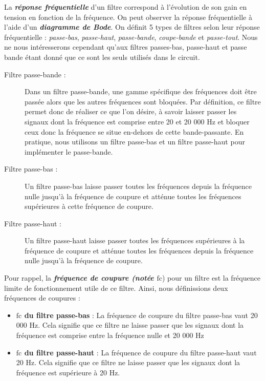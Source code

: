 \documentclass[10pt, oneside, a4paper]{article}
\begin{document}
La \textbf{\textit{réponse fréquentielle}} d'un filtre correspond à l'évolution de son gain en tension en fonction de la fréquence. On peut observer la réponse fréquentielle à l'aide d'un \textbf{\textit{diagramme de Bode}}.
On définit 5 types de filtres selon leur réponse fréquentielle : \textit{passe-bas}, \textit{passe-haut}, \textit{passe-bande}, \textit{coupe-bande} et \textit{passe-tout}. Nous ne nous intéresserons cependant qu'aux filtres passes-bas, passe-haut et passe bande étant donné que ce sont les seuls utilisés dans le circuit.
\begin{description}
\item[Filtre passe-bande :] Dans un filtre passe-bande, une gamme spécifique des fréquences doit être passée alors que les autres fréquences sont bloquées. Par définition, ce filtre permet donc de réaliser ce que l'on désire, à savoir laisser passer les signaux dont la fréquence est comprise entre 20 et 20 000 Hz et bloquer ceux donc la fréquence se situe en-dehors de cette bande-passante. En pratique, nous utilisons un filtre passe-bas et un filtre passe-haut pour implémenter le passe-bande.
\item[Filtre passe-bas :] Un filtre passe-bas laisse passer toutes les fréquences depuis la fréquence nulle jusqu'à la fréquence de coupure et atténue toutes les fréquences supérieures à cette fréquence de coupure.
\item[Filtre passe-haut :] Un filtre passe-haut laisse passer toutes les fréquences supérieures à la fréquence de coupure et atténue toutes les fréquences depuis la fréquence nulle jusqu'à la fréquence de coupure.
\end{description}

Pour rappel, la \textbf{\textit{fréquence de coupure (notée $\text{fc}$}}) pour un filtre est la fréquence limite de fonctionnement utile de ce filtre. Ainsi, nous définissions deux fréquences de coupures : 
\begin{itemize}
\item \textbf{\textit{$\text{fc}$} du filtre passe-bas} : La fréquence de coupure du filtre passe-bas vaut 20 000 Hz. Cela signifie que ce filtre ne laisse passer que les signaux dont la fréquence est comprise entre la fréquence nulle et 20 000 Hz
\item \textbf{\textit{$\text{fc}$} du filtre passe-haut} : La fréquence de coupure du filtre passe-haut vaut 20 Hz. Cela signifie que ce filtre ne laisse passer que les signaux dont la fréquence est supérieure à 20 Hz.
\end{itemize}
\end{document}
